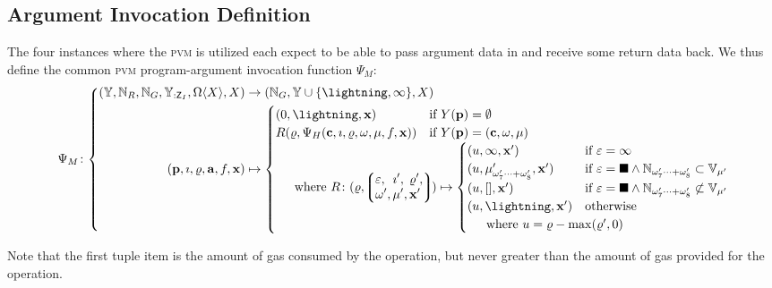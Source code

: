 \subsection{Argument Invocation Definition}

The four instances where the \textsc{pvm} is utilized each expect to be able to pass argument data in and receive some return data back. We thus define the common \textsc{pvm} program-argument invocation function $\Psi_M$:
\begin{equation}
  \Psi_M\colon \left\{\begin{aligned}
    \left(
      \Y, \N_R, \N_G, \Y_{:\mathsf{Z}_I}, \Omega\langle X \rangle, X
    \right) &\to (\N_G, \Y \cup \{\panic, \oog\}, X)\\
    (\mathbf{p}, \imath, \gascounter, \mathbf{a}, f, \mathbf{x}) &\mapsto \begin{cases}
      (0, \panic, \mathbf{x}) &\when Y(\mathbf{p}) = \none\\
      R(\gascounter, \Psi_H(\mathbf{c}, \imath, \gascounter, \registers, \mem, f, \mathbf{x})) &\when Y(\mathbf{p}) = (\mathbf{c}, \registers, \mem)\\
      \multicolumn{2}{l}{
        \quad \where R \colon (\gascounter, \tup{\begin{alignedat}{5}
          &\varepsilon,\, &&\imath',\, &&\gascounter',\\
          &\registers',\, &&\mem',\, &&\mathbf{x}'
        \end{alignedat}
        }) \mapsto \begin{cases}
          (u, \oog, \mathbf{x}') &\when \varepsilon = \oog \\
          (u, \memory'_{\registers'_{7}\dots+\registers'_{8}}, \mathbf{x}') &\when \varepsilon = \halt \wedge \mathbb{N}_{\registers'_{7}\dots+\registers'_{8}} \subset \mathbb{V}_{\mem'} \\
          (u, [], \mathbf{x}') &\when \varepsilon = \halt \wedge \mathbb{N}_{\registers'_{7}\dots+\registers'_{8}} \not\subset \mathbb{V}_{\mem'} \\
          (u, \panic, \mathbf{x}') &\otherwise \\
          \multicolumn{2}{l}{\quad \where u = \gascounter - \max(\gascounter', 0)}
        \end{cases}
      }\!\!\!\!\!\!\!\!
    \end{cases}
  \end{aligned}\right.
\end{equation}

Note that the first tuple item is the amount of gas consumed by the operation, but never greater than the amount of gas provided for the operation.